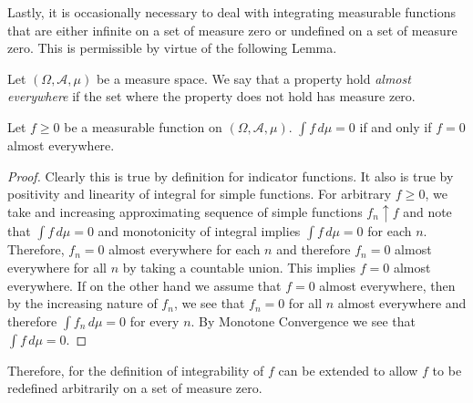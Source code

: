 Lastly, it is occasionally necessary to deal with integrating
measurable functions that are either infinite on a set of measure zero
or undefined on a set of measure zero.  This is permissible by virtue
of the following Lemma.
\begin{defn}Let $(\Omega,  \mathcal{A}, \mu)$ be a measure space.  We
  say that a property hold \emph{almost everywhere} if the set where
  the property does not hold has measure zero.
\end{defn}
\begin{lem}\label{ZeroIntegralImpliesZeroFunction}Let $f \geq 0$ be a measurable function on $(\Omega,
  \mathcal{A}, \mu)$.  $\int f \, d\mu = 0$ if and only if $f = 0$
  almost everywhere.
\end{lem}
\begin{proof}Clearly this is true by definition for indicator
  functions.  It also is true by positivity and linearity of integral
  for simple functions.  For arbitrary $f\geq 0$, we take and
increasing  approximating sequence of simple functions $f_n \uparrow
f$ and note that $\int f \, d\mu = 0$ and monotonicity of integral
implies $\int f \, d\mu = 0$ for each $n$.  Therefore, $f_n = 0$ almost
everywhere for each $n$ and therefore $f_n = 0$ almost everywhere for
all $n$ by taking a countable union.  This implies $f = 0$ almost
everywhere. 
If on the other hand we assume that $f = 0$ almost
everywhere, then by the increasing nature of $f_n$, we see that $f_n
=0$ for all $n$ almost everywhere and therefore $\int f_n \, d\mu = 0$
for every $n$.  By Monotone Convergence we see that $\int f \, d\mu = 0$.
\end{proof}
Therefore, for the definition of integrability of $f$ can be extended
to allow $f$ to be redefined arbitrarily on a set of measure zero.
 
